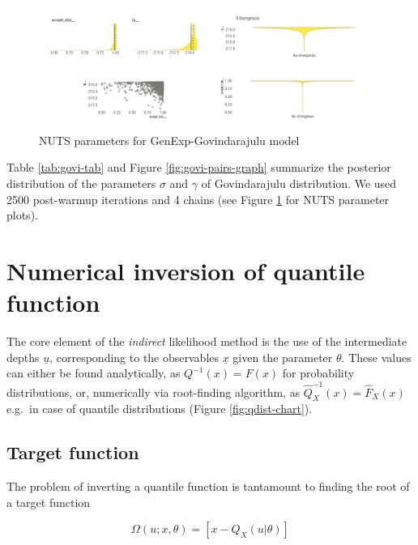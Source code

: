 \documentclass[
  12pt,
]{article}
\begin{document}
\begin{figure}

{\centering \includegraphics[width=1\linewidth]{ilbm_article_files/figure-latex/govi-nuts-graph-1} 

}

\caption{NUTS parameters for GenExp-Govindarajulu model}\label{fig:govi-nuts-graph}
\end{figure}

Table \ref{tab:govi-tab} and Figure \ref{fig:govi-pairs-graph} summarize the posterior distribution of the parameters \(\sigma\) and \(\gamma\) of Govindarajulu distribution. We used 2500 post-warmup iterations and 4 chains (see Figure \ref{fig:govi-nuts-graph} for NUTS parameter plots).

\hypertarget{numerical-inversion-of-quantile-function}{%
\section{Numerical inversion of quantile function}\label{numerical-inversion-of-quantile-function}}

The core element of the \emph{indirect} likelihood method is the use of the intermediate depths \(\underline{u}\), corresponding to the observables \(\underline{x}\) given the parameter \(\theta\). These values can either be found analytically, as \(Q^{-1}(x)=F(x)\) for probability distributions, or, numerically via root-finding algorithm, as \(\widehat{Q}^{-1}_X(x)=\widehat{F}_X(x)\) e.g.~in case of quantile distributions (Figure \ref{fig:qdist-chart}).

\hypertarget{target-function}{%
\subsection{Target function}\label{target-function}}

The problem of inverting a quantile function is tantamount to finding the root of a target function

\[
 \Omega(u;x,\theta)=[x-Q_X(u|\theta)]
\]
\end{document}
